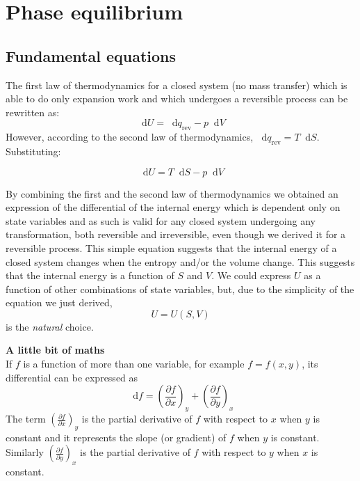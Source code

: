 \documentclass[12pt,a4paper]{report}
\newcommand*\diff{\mathop{}\!\mathrm{d}}
\newif\ifstudents
\begin{document}
   \pagestyle{headings}
   \thispagestyle{plain}
   \newpage
   \noindent
   \begin{center}
   \end{center}
   \section*{Phase equilibrium}
   \subsection*{Fundamental equations}
   The first law of thermodynamics for a closed system (no mass transfer) which is able to do only expansion work and which undergoes a reversible process can be rewritten as:
   \begin{equation*}
   \diff U = \diff q_{\mathrm{rev}} -p \diff V
   \end{equation*}
   However, according to the second law of thermodynamics, $\diff q_{\mathrm{rev}}=T\diff S$. Substituting: 
   \ifstudents \hideit[2]{ \fi
   \begin{equation*}
   \diff U = T\diff S-p \diff V
   \end{equation*}
   \ifstudents } \fi
   By combining the first and the second law of thermodynamics we obtained an expression of the differential of the internal energy which is dependent only on state variables and as such is valid for any closed system undergoing any transformation, both reversible and irreversible, even though we derived it for a reversible process. This simple equation suggests that the internal energy of a closed system changes when the entropy and/or the volume change. This suggests that the internal energy is a function of $S$ and $V$. We could express $U$ as a function of other combinations of state variables, but, due to the simplicity of the equation we just derived,
   \begin{equation*}
   U=U(S,V)
   \end{equation*}
   is the \textit{natural} choice.
   \begin{mdframed}
   \textbf{A little bit of maths}\\
   If $f$ is a function of more than one variable, for example $f=f(x,y)$, its differential can be expressed as 
   \begin{equation*}
   \diff f = \left(\frac{\partial f}{\partial x}\right)_{y}+\left(\frac{\partial f}{\partial y}\right)_{x}
   \end{equation*}
   The term $\left(\frac{\partial f}{\partial x}\right)_{y}$ is the partial derivative of $f$ with respect to $x$ when $y$ is constant and it represents the slope (or gradient) of $f$ when $y$ is constant. Similarly $\left(\frac{\partial f}{\partial y}\right)_{x}$ is the partial derivative of $f$ with respect to $y$ when $x$ is constant.
   \end{mdframed}
\end{document}
